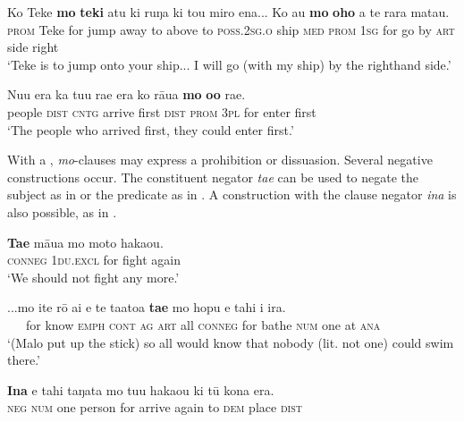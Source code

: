 \ea\label{ex:11.159}
\gll Ko Teke \textbf{mo} \textbf{teki} atu ki ruŋa ki to{\ꞌ}u miro ena... Ko au \textbf{mo} \textbf{oho}  a te rara mata{\ꞌ}u.\\
\textsc{prom} Teke for jump away to above to \textsc{poss.2sg.o} ship \textsc{med} \textsc{prom} \textsc{1sg} for go  by \textsc{art} side right\\

\glt 
‘Teke is to jump onto your ship... I will go (with my ship) by the righthand side.’ 
\z

\ea\label{ex:11.160}
\gll Nu{\ꞌ}u era ka tu{\ꞌ}u ra{\ꞌ}e era ko rāua \textbf{mo} \textbf{o{\ꞌ}o} ra{\ꞌ}e. \\
people \textsc{dist} \textsc{cntg} arrive first \textsc{dist} \textsc{prom} \textsc{3pl} for enter first \\

\glt 
‘The people who arrived first, they could enter first.’ \textstyleExampleref{[R250.071]} 
\z

With a , \textit{mo}{}-clauses may express a prohibition or dissuasion. Several negative constructions occur. The constituent negator \textit{ta{\ꞌ}e} can be used to negate the subject as in  or the predicate as in . A construction with the clause negator \textit{{\ꞌ}ina} is also possible, as in .

\ea\label{ex:11.161}
\gll \textbf{Ta{\ꞌ}e} māua mo moto haka{\ꞌ}ou. \\
\textsc{conneg} \textsc{1du.excl} for fight again \\

\glt 
‘We should not fight any more.’ \textstyleExampleref{[R211.014]} 
\z

\ea\label{ex:11.162}
\gll ...mo {\ꞌ}ite rō {\ꞌ}ai e te ta{\ꞌ}ato{\ꞌ}a \textbf{ta{\ꞌ}e} mo hopu e tahi {\ꞌ}i ira.\\
~~~for know \textsc{emph} \textsc{cont} \textsc{ag} \textsc{art} all \textsc{conneg} for bathe \textsc{num} one at \textsc{ana}\\

\glt 
‘(Malo put up the stick) so all would know that nobody (lit. not one) could swim there.’ \textstyleExampleref{[R108.030]} 
\z

\ea\label{ex:11.163}
\gll \textbf{{\ꞌ}Ina} e tahi taŋata mo tu{\ꞌ}u haka{\ꞌ}ou ki tū kona era. \\
\textsc{neg} \textsc{num} one person for arrive again to \textsc{dem} place \textsc{dist} \\

